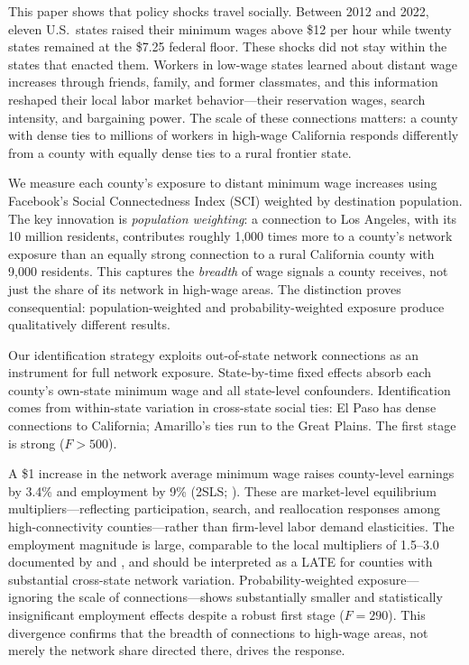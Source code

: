 \documentclass[12pt]{article}
\begin{document}
This paper shows that policy shocks travel socially. Between 2012 and 2022, eleven U.S.\ states raised their minimum wages above \$12 per hour while twenty states remained at the \$7.25 federal floor. These shocks did not stay within the states that enacted them. Workers in low-wage states learned about distant wage increases through friends, family, and former classmates, and this information reshaped their local labor market behavior---their reservation wages, search intensity, and bargaining power. The scale of these connections matters: a county with dense ties to millions of workers in high-wage California responds differently from a county with equally dense ties to a rural frontier state.

We measure each county's exposure to distant minimum wage increases using Facebook's Social Connectedness Index (SCI) weighted by destination population. The key innovation is \textit{population weighting}: a connection to Los Angeles, with its 10 million residents, contributes roughly 1,000 times more to a county's network exposure than an equally strong connection to a rural California county with 9,000 residents. This captures the \textit{breadth} of wage signals a county receives, not just the share of its network in high-wage areas. The distinction proves consequential: population-weighted and probability-weighted exposure produce qualitatively different results.

Our identification strategy exploits out-of-state network connections as an instrument for full network exposure. State-by-time fixed effects absorb each county's own-state minimum wage and all state-level confounders. Identification comes from within-state variation in cross-state social ties: El Paso has dense connections to California; Amarillo's ties run to the Great Plains. The first stage is strong ($F > 500$).

A \$1 increase in the network average minimum wage raises county-level earnings by 3.4\% and employment by 9\% (2SLS; ). These are market-level equilibrium multipliers---reflecting participation, search, and reallocation responses among high-connectivity counties---rather than firm-level labor demand elasticities. The employment magnitude is large, comparable to the local multipliers of 1.5--3.0 documented by \citet{moretti2011local} and \citet{klinemoretti2014}, and should be interpreted as a LATE for counties with substantial cross-state network variation. Probability-weighted exposure---ignoring the scale of connections---shows substantially smaller and statistically insignificant employment effects despite a robust first stage ($F = 290$). This divergence confirms that the breadth of connections to high-wage areas, not merely the network share directed there, drives the response.
\end{document}
